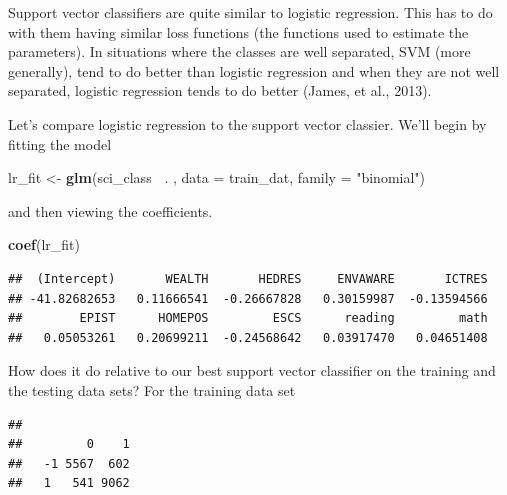 \documentclass[]{book}
\newenvironment{Shaded}{\begin{snugshade}}{\end{snugshade}}
\newcommand{\DataTypeTok}[1]{\textcolor[rgb]{0.13,0.29,0.53}{#1}}
\newcommand{\KeywordTok}[1]{\textcolor[rgb]{0.13,0.29,0.53}{\textbf{#1}}}
\newcommand{\NormalTok}[1]{#1}
\newcommand{\OperatorTok}[1]{\textcolor[rgb]{0.81,0.36,0.00}{\textbf{#1}}}
\newcommand{\StringTok}[1]{\textcolor[rgb]{0.31,0.60,0.02}{#1}}
\begin{document}
Support vector classifiers are quite similar to logistic regression. This has to do with them having similar loss functions (the functions used to estimate the parameters). In situations where the classes are well separated, SVM (more generally), tend to do better than logistic regression and when they are not well separated, logistic regression tends to do better (James, et al., 2013).

Let's compare logistic regression to the support vector classier. We'll begin by fitting the model

\begin{Shaded}
\begin{Highlighting}[]
\NormalTok{lr_fit <-}\StringTok{ }\KeywordTok{glm}\NormalTok{(sci_class }\OperatorTok{~}\NormalTok{. , }\DataTypeTok{data =}\NormalTok{ train_dat, }\DataTypeTok{family =} \StringTok{"binomial"}\NormalTok{)}
\end{Highlighting}
\end{Shaded}

and then viewing the coefficients.

\begin{Shaded}
\begin{Highlighting}[]
\KeywordTok{coef}\NormalTok{(lr_fit)}
\end{Highlighting}
\end{Shaded}

\begin{verbatim}
##  (Intercept)       WEALTH       HEDRES     ENVAWARE       ICTRES 
## -41.82682653   0.11666541  -0.26667828   0.30159987  -0.13594566 
##        EPIST      HOMEPOS         ESCS      reading         math 
##   0.05053261   0.20699211  -0.24568642   0.03917470   0.04651408
\end{verbatim}

How does it do relative to our best support vector classifier on the training and the testing data sets? For the training data set

\begin{Shaded}
\end{Shaded}

\begin{verbatim}
##     
##         0    1
##   -1 5567  602
##   1   541 9062
\end{verbatim}
\end{document}
